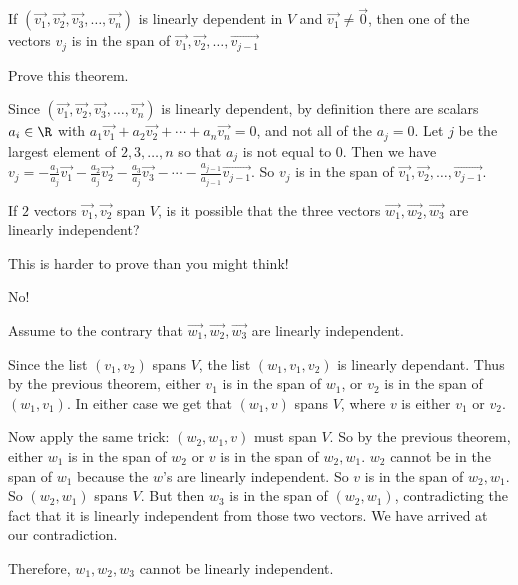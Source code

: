 \documentclass{ximera}
\begin{document}
 \begin{theorem}
 	If $(\vec{v_1},\vec{v_2},\vec{v_3}, \ldots, \vec{v_n})$ is linearly dependent in $V$ and $\vec{v_1} \neq \vec{0}$, then one of the vectors $v_j$ is in the 
 	span of $\vec{v_1},\vec{v_2},\ldots,\vec{v_{j-1}}$
 \end{theorem}
 
Prove this theorem.

\begin{free-response}
 	Since $(\vec{v_1},\vec{v_2},\vec{v_3}, \ldots, \vec{v_n})$ is linearly dependent, by definition there are scalars $a_i \in \R$ with 
 	$a_1\vec{v_1}+a_2\vec{v_2}+ \cdots +a_n\vec{v_n} = 0$, and not all of the $a_j =0$.  Let $j$ be the largest element of ${2,3,\ldots,n}$ so that $a_j$ is not equal to $0$.
 	Then we have 
 	$v_j = -\frac{a_1}{a_j}\vec{v_1}-\frac{a_2}{a_j}\vec{v_2} -\frac{a_3}{a_j}\vec{v_3} - \cdots -\frac{a_{j-1}}{a_{j-1}}\vec{v_{j-1}}$.
 	So $v_j$ is in the span of $\vec{v_1},\vec{v_2},\ldots,\vec{v_{j-1}}$.
 \end{free-response}
 
 
 	If $2$ vectors $\vec{v_1},\vec{v_2}$ span $V$, is it possible that the three vectors $\vec{w_1},\vec{w_2},\vec{w_3}$ are linearly independent?
 	
 	\begin{warning}
 		This is harder to prove than you might think!
 	\end{warning}
\begin{free-response}
	No!
	
	Assume to the contrary that $\vec{w_1},\vec{w_2},\vec{w_3}$ are linearly independent.
	
	Since the list $(v_1,v_2)$ spans $V$, the list $(w_1,v_1,v_2)$ is linearly dependant.  Thus by the previous theorem, either $v_1$ is in the span of $w_1$,
	or $v_2$ is in the span of $(w_1,v_1)$.  In either case we get that $(w_1,v)$ spans $V$, where $v$ is either $v_1$ or $v_2$.
	
	Now apply the same trick:  $(w_2,w_1,v)$ must span $V$.  So by the previous theorem, either $w_1$ is in the span of $w_2$ or $v$ is in the span of $w_2,w_1$.  
	$w_2$ cannot be in the span of $w_1$ because the $w$'s are linearly independent.  So $v$ is in the span of $w_2,w_1$.  So $(w_2,w_1)$ spans $V$.  But then
	$w_3$ is in the span of $(w_2,w_1)$, contradicting the fact that it is linearly independent from those two vectors.  We have arrived at our contradiction.
	
	Therefore, $w_1,w_2,w_3$ cannot be linearly independent.
\end{free-response}
\end{document}
